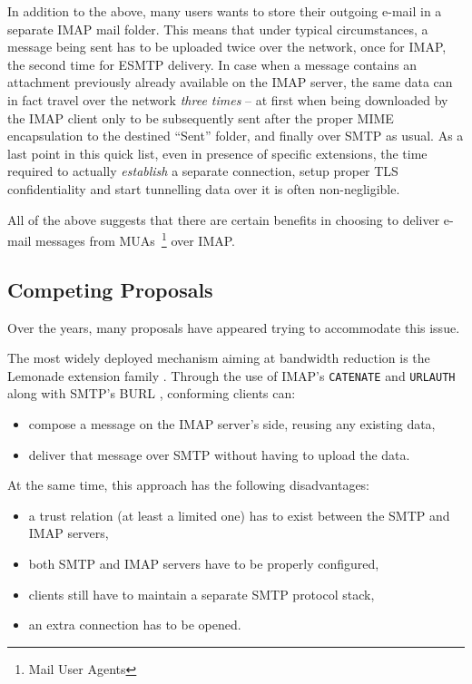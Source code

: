 \documentclass[trojita]{subfiles}
\begin{document}
In addition to the above, many users wants to store their outgoing e-mail in a separate IMAP mail folder.  This means
that under typical circumstances, a message being sent has to be uploaded twice over the network, once for IMAP, the
second time for ESMTP delivery.  In case when a message contains an attachment previously already available on the IMAP
server, the same data can in fact travel over the network {\em three times} -- at first when being downloaded by the
IMAP client only to be subsequently sent after the proper MIME encapsulation to the destined ``Sent'' folder, and
finally over SMTP as usual.  As a last point in this quick list, even in presence of specific extensions, the time
required to actually {\em establish} a separate connection, setup proper TLS confidentiality and start tunnelling data
over it is often non-negligible.

All of the above suggests that there are certain benefits in choosing to deliver e-mail messages from
MUAs~\footnote{Mail User Agents} over IMAP.

\subsection{Competing Proposals}

Over the years, many proposals have appeared trying to accommodate this issue.

The most widely deployed mechanism aiming at bandwidth reduction is the Lemonade extension family \cite{rfc5550}.
Through the use of IMAP's {\tt CATENATE} \cite{rfc4469} and {\tt URLAUTH} \cite{rfc4467} along with SMTP's BURL
\cite{rfc4468}, conforming clients can:

\begin{itemize}
  \item compose a message on the IMAP server's side, reusing any existing data,
  \item deliver that message over SMTP without having to upload the data.
\end{itemize}

At the same time, this approach has the following disadvantages:

\begin{itemize}
  \item a trust relation (at least a limited one) has to exist between the SMTP and IMAP servers,
  \item both SMTP and IMAP servers have to be properly configured,
  \item clients still have to maintain a separate SMTP protocol stack,
  \item an extra connection has to be opened.
\end{itemize}
\end{document}
